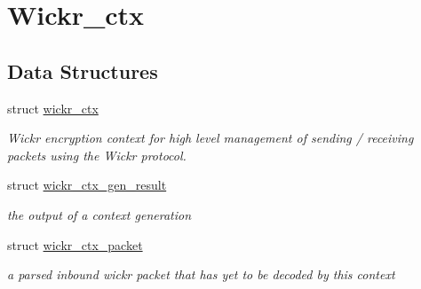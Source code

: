 \hypertarget{group__wickr__ctx}{}\section{Wickr\+\_\+ctx}
\label{group__wickr__ctx}
\subsection*{Data Structures}
\begin{DoxyCompactItemize}
\item 
struct \mbox{\hyperlink{structwickr__ctx}{wickr\+\_\+ctx}}
\begin{DoxyCompactList}\small\item\em Wickr encryption context for high level management of sending / receiving packets using the Wickr protocol. \end{DoxyCompactList}\item 
struct \mbox{\hyperlink{structwickr__ctx__gen__result}{wickr\+\_\+ctx\+\_\+gen\+\_\+result}}
\begin{DoxyCompactList}\small\item\em the output of a context generation \end{DoxyCompactList}\item 
struct \mbox{\hyperlink{structwickr__ctx__packet}{wickr\+\_\+ctx\+\_\+packet}}
\begin{DoxyCompactList}\small\item\em a parsed inbound wickr packet that has yet to be decoded by this context \end{DoxyCompactList}\end{DoxyCompactItemize}
